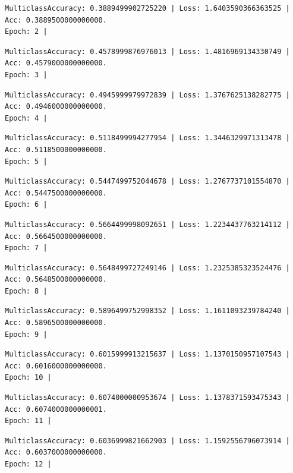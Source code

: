 \documentclass[
  letterpaper,
  DIV=11,
  numbers=noendperiod]{scrreprt}
\begin{document}
\begin{verbatim}
MulticlassAccuracy: 0.3889499902725220 | Loss: 1.6403590366363525 | Acc: 0.3889500000000000.
Epoch: 2 | 
\end{verbatim}

\begin{verbatim}
MulticlassAccuracy: 0.4578999876976013 | Loss: 1.4816969134330749 | Acc: 0.4579000000000000.
Epoch: 3 | 
\end{verbatim}

\begin{verbatim}
MulticlassAccuracy: 0.4945999979972839 | Loss: 1.3767625138282775 | Acc: 0.4946000000000000.
Epoch: 4 | 
\end{verbatim}

\begin{verbatim}
MulticlassAccuracy: 0.5118499994277954 | Loss: 1.3446329971313478 | Acc: 0.5118500000000000.
Epoch: 5 | 
\end{verbatim}

\begin{verbatim}
MulticlassAccuracy: 0.5447499752044678 | Loss: 1.2767737101554870 | Acc: 0.5447500000000000.
Epoch: 6 | 
\end{verbatim}

\begin{verbatim}
MulticlassAccuracy: 0.5664499998092651 | Loss: 1.2234437763214112 | Acc: 0.5664500000000000.
Epoch: 7 | 
\end{verbatim}

\begin{verbatim}
MulticlassAccuracy: 0.5648499727249146 | Loss: 1.2325385323524476 | Acc: 0.5648500000000000.
Epoch: 8 | 
\end{verbatim}

\begin{verbatim}
MulticlassAccuracy: 0.5896499752998352 | Loss: 1.1611093239784240 | Acc: 0.5896500000000000.
Epoch: 9 | 
\end{verbatim}

\begin{verbatim}
MulticlassAccuracy: 0.6015999913215637 | Loss: 1.1370150957107543 | Acc: 0.6016000000000000.
Epoch: 10 | 
\end{verbatim}

\begin{verbatim}
MulticlassAccuracy: 0.6074000000953674 | Loss: 1.1378371593475343 | Acc: 0.6074000000000001.
Epoch: 11 | 
\end{verbatim}

\begin{verbatim}
MulticlassAccuracy: 0.6036999821662903 | Loss: 1.1592556796073914 | Acc: 0.6037000000000000.
Epoch: 12 | 
\end{verbatim}
\end{document}
